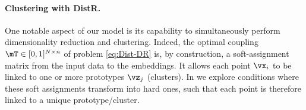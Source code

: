 \paragraph{Clustering with DistR.} One notable aspect of our model is its
capability to simultaneously perform dimensionality reduction and clustering.
Indeed, the optimal coupling $\mT \in [0, 1]^{N \times n}$ of problem
\cref{eq:Dist-DR} is, by construction, a soft-assignment matrix from the input
data to the embeddings. It allows each point $\vx_i$ to be linked to one or more
prototypes $\vz_j$ (clusters). In  we explore
conditions where these soft assignments transform into hard ones, such that each
point is therefore linked to a unique prototype/cluster.



